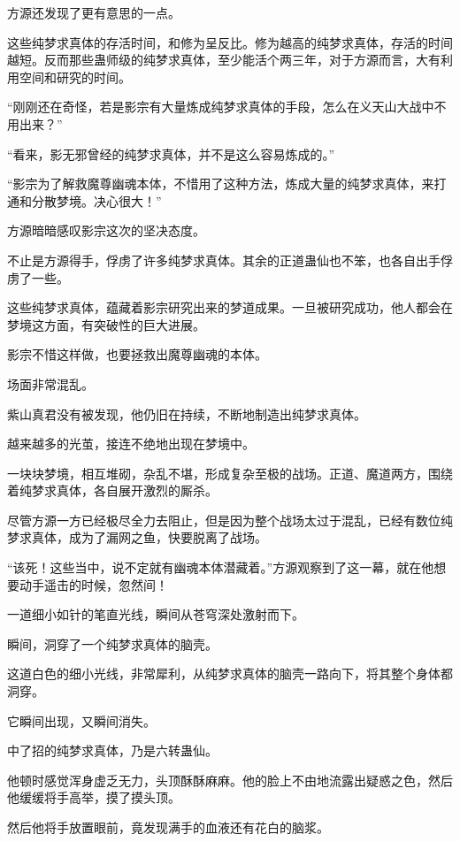 
\begin{this_body}

方源还发现了更有意思的一点。

这些纯梦求真体的存活时间，和修为呈反比。修为越高的纯梦求真体，存活的时间越短。反而那些蛊师级的纯梦求真体，至少能活个两三年，对于方源而言，大有利用空间和研究的时间。

“刚刚还在奇怪，若是影宗有大量炼成纯梦求真体的手段，怎么在义天山大战中不用出来？”

“看来，影无邪曾经的纯梦求真体，并不是这么容易炼成的。”

“影宗为了解救魔尊幽魂本体，不惜用了这种方法，炼成大量的纯梦求真体，来打通和分散梦境。决心很大！”

方源暗暗感叹影宗这次的坚决态度。

不止是方源得手，俘虏了许多纯梦求真体。其余的正道蛊仙也不笨，也各自出手俘虏了一些。

这些纯梦求真体，蕴藏着影宗研究出来的梦道成果。一旦被研究成功，他人都会在梦境这方面，有突破性的巨大进展。

影宗不惜这样做，也要拯救出魔尊幽魂的本体。

场面非常混乱。

紫山真君没有被发现，他仍旧在持续，不断地制造出纯梦求真体。

越来越多的光茧，接连不绝地出现在梦境中。

一块块梦境，相互堆砌，杂乱不堪，形成复杂至极的战场。正道、魔道两方，围绕着纯梦求真体，各自展开激烈的厮杀。

尽管方源一方已经极尽全力去阻止，但是因为整个战场太过于混乱，已经有数位纯梦求真体，成为了漏网之鱼，快要脱离了战场。

“该死！这些当中，说不定就有幽魂本体潜藏着。”方源观察到了这一幕，就在他想要动手遥击的时候，忽然间！

一道细小如针的笔直光线，瞬间从苍穹深处激射而下。

瞬间，洞穿了一个纯梦求真体的脑壳。

这道白色的细小光线，非常犀利，从纯梦求真体的脑壳一路向下，将其整个身体都洞穿。

它瞬间出现，又瞬间消失。

中了招的纯梦求真体，乃是六转蛊仙。

他顿时感觉浑身虚乏无力，头顶酥酥麻麻。他的脸上不由地流露出疑惑之色，然后他缓缓将手高举，摸了摸头顶。

然后他将手放置眼前，竟发现满手的血液还有花白的脑浆。


\end{this_body}
